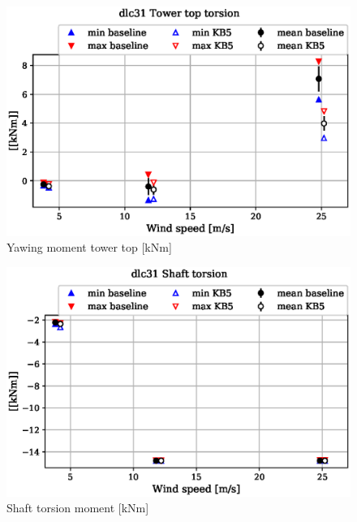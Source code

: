 \begin{figure}[!ht]
\begin{center}
	\includegraphics[width=.85\linewidth]{figures/baseline-vs-KB6/dlc31/tower-tower-node-004-momentvec-z_AA0007_AA0003.eps}
\end{center}
\caption{Yawing moment tower top [kNm]}
\label{fig:baseline-vs-KB6:dlc31:tower-top-yaw}
\end{figure}

\begin{figure}[!ht]
\begin{center}
	\includegraphics[width=.85\linewidth]{figures/baseline-vs-KB6/dlc31/shaft-shaft-node-001-momentvec-z_AA0007_AA0003.eps}
\end{center}
\caption{Shaft torsion moment [kNm]}
\label{fig:baseline-vs-KB6:dlc31:shaft-torsion}
\end{figure}

